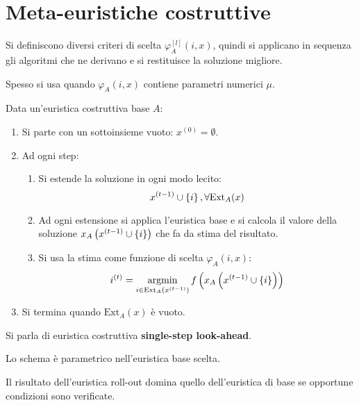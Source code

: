 \documentclass[\main/main.tex]{subfiles}
\providecommand{\Ext}{\text{Ext}_A}
\begin{document}
\chapter{Meta-euristiche costruttive}
\begin{multicols}{2}
\begin{definition}
    Si definiscono diversi criteri di scelta \(\varphi_{A}^{[l]}(i, x)\), quindi si applicano in sequenza gli algoritmi che ne derivano e si restituisce la soluzione migliore.

    Spesso si usa quando \(\varphi_A(i, x)\) contiene parametri numerici \(\mu\).
\end{definition}
\begin{definition}
    Data un'euristica costruttiva base \(A\):
    \begin{enumerate}
        \item Si parte con un sottoinsieme vuoto: \(x^{(0)} = \emptyset\).
        \item Ad ogni step:
        \begin{enumerate}
            \item Si estende la soluzione in ogni modo lecito:
            \[
                x^{(t-1)} \cup \crl{i}, \forall \Ext(x)
            \]
            \item Ad ogni estensione si applica l'euristica base e si calcola il valore della soluzione \(x_A\left(x^{(t-1)} \cup \left\{i\right\}\right)\) che fa da stima del risultato.
            \item Si usa la stima come funzione di scelta \(\varphi_A(i, x)\):
            \[
                i^{(t)} = \argmin_{i \in \Ext(x^{(t-1)})} f\rnd{x_A\rnd{x^{(t-1)} \cup \crl{i}}}
            \]
        \end{enumerate}
        \item Si termina quando \(\Ext(x)\) è vuoto.
    \end{enumerate}
    
    Si parla di euristica costruttiva \textbf{single-step look-ahead}.
    
    Lo schema è parametrico nell'euristica base scelta.
\end{definition}
\begin{observation}
    Il risultato dell'euristica roll-out domina quello dell'euristica di base se opportune condizioni sono verificate.


\end{observation}
\end{multicols}
\end{document}

